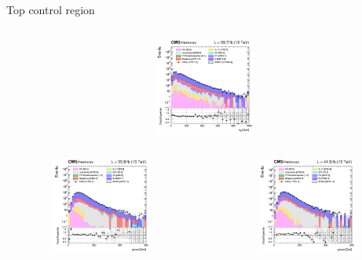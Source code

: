 \documentclass[8pt]{beamer}
\begin{document}
\begin{frame}{Top control region}
\begin{columns}
\begin{column}{0.33\textwidth}
			\begin{center}
			\vspace{-8pt}
			\begin{block}{}\end{block}\vspace{10pt}
     			\includegraphics[width=1.0\textwidth, height=90pt]{figs/2018/log_cratio_ttbarCR_ll_mll.png}
    		\end{center}		
		\end{column}
\end{columns} \vspace{-10pt}
\begin{columns}
		\begin{column}{0.33\textwidth}
			\begin{center}
     			\includegraphics[width=1.0\textwidth, height=90pt]{figs/2016/log_cratio_ttbarCR_ll_METcorrected_pt.png}
    		\end{center}		
		\end{column}
		\begin{column}{0.33\textwidth}
			\begin{center}
     			\includegraphics[width=1.0\textwidth, height=90pt]{figs/2017/log_cratio_ttbarCR_ll_METcorrected_pt.png}
    		\end{center}		

\end{column}
\end{columns}
\end{frame}
\end{document}
